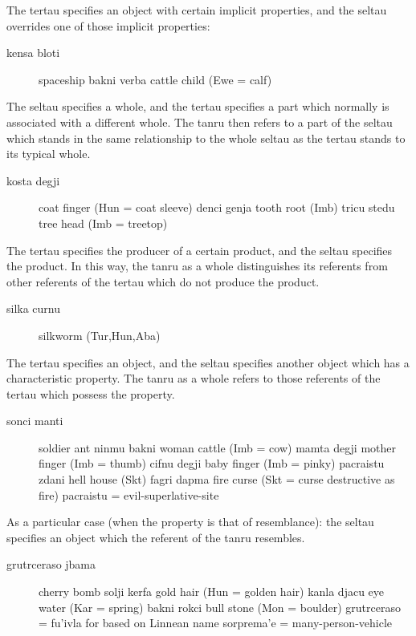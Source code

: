 The tertau specifies an object with certain implicit
    properties, and the seltau overrides one of those implicit
    properties: 
\begin{description}
\item[kensa bloti] spaceship bakni verba cattle child (Ewe = calf)
\end{description}

The seltau specifies a whole, and the tertau specifies a part
    which normally is associated with a different whole. The tanru
    then refers to a part of the seltau which stands in the same
    relationship to the whole seltau as the tertau stands to its
    typical whole. 
\begin{description}
\item[kosta degji] coat finger (Hun = coat sleeve) denci genja tooth root (Imb) tricu stedu tree head (Imb = treetop)
\end{description}

The tertau specifies the producer of a certain product, and the
    seltau specifies the product. In this way, the tanru as a whole
    distinguishes its referents from other referents of the tertau
    which do not produce the product. 
\begin{description}
\item[silka curnu] silkworm (Tur,Hun,Aba)
\end{description}

The tertau specifies an object, and the seltau specifies
    another object which has a characteristic property. The tanru
    as a whole refers to those referents of the tertau which
    possess the property. 
\begin{description}
\item[sonci manti] soldier ant ninmu bakni woman cattle (Imb = cow) mamta degji mother finger (Imb = thumb) cifnu degji baby finger (Imb = pinky) pacraistu zdani hell house (Skt) fagri dapma fire curse (Skt = curse destructive as fire) pacraistu = evil-superlative-site
\end{description}

As a particular case (when the property is that of
    resemblance): the seltau specifies an object which the referent
    of the tanru resembles. 
\begin{description}
\item[grutrceraso jbama] cherry bomb solji kerfa gold hair (Hun = golden hair) kanla djacu eye water (Kar = spring) bakni rokci bull stone (Mon = boulder) grutrceraso = fu'ivla for  based on Linnean name sorprema'e = many-person-vehicle
\end{description}

